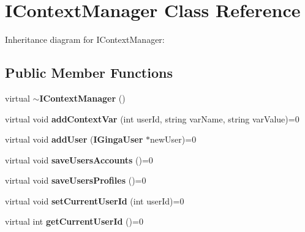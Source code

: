 \section{IContextManager Class Reference}
\label{classbr_1_1pucrio_1_1telemidia_1_1ginga_1_1core_1_1contextmanager_1_1IContextManager}
Inheritance diagram for IContextManager:\subsection*{Public Member Functions}
\begin{CompactItemize}
\item 
virtual {\bf $\sim$IContextManager} ()\label{classbr_1_1pucrio_1_1telemidia_1_1ginga_1_1core_1_1contextmanager_1_1IContextManager_451f7786b12528d17551670b270e47ad}

\item 
virtual void \textbf{addContextVar} (int userId, string varName, string varValue)=0\label{classbr_1_1pucrio_1_1telemidia_1_1ginga_1_1core_1_1contextmanager_1_1IContextManager_23e4be22e2b5eb38eab013b319cbdf43}

\item 
virtual void \textbf{addUser} ({\bf IGingaUser} $\ast$newUser)=0\label{classbr_1_1pucrio_1_1telemidia_1_1ginga_1_1core_1_1contextmanager_1_1IContextManager_16cd81861162e876101d6d650500bbdc}

\item 
virtual void \textbf{saveUsersAccounts} ()=0\label{classbr_1_1pucrio_1_1telemidia_1_1ginga_1_1core_1_1contextmanager_1_1IContextManager_6d670ff5bc0eb21e77dc0eabaa2512a7}

\item 
virtual void \textbf{saveUsersProfiles} ()=0\label{classbr_1_1pucrio_1_1telemidia_1_1ginga_1_1core_1_1contextmanager_1_1IContextManager_454696c6af26a2abc6d74a9d23aa6074}

\item 
virtual void \textbf{setCurrentUserId} (int userId)=0\label{classbr_1_1pucrio_1_1telemidia_1_1ginga_1_1core_1_1contextmanager_1_1IContextManager_610ad65710d7d47babdd4a1a06074d44}

\item 
virtual int \textbf{getCurrentUserId} ()=0\label{classbr_1_1pucrio_1_1telemidia_1_1ginga_1_1core_1_1contextmanager_1_1IContextManager_b27b5a0294f88873b6a1f7763e454347}


\end{CompactItemize}
